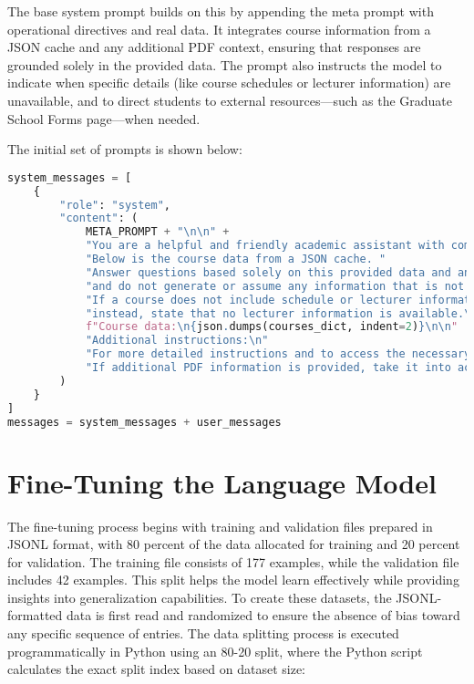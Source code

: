 \documentclass[12pt,oneside,openany]{report}
\begin{document}
The base system prompt builds on this by appending the meta prompt with operational directives and real data. It integrates course information from a JSON cache and any additional PDF context, ensuring that responses are grounded solely in the provided data. The prompt also instructs the model to indicate when specific details (like course schedules or lecturer information) are unavailable, and to direct students to external resources—such as the Graduate School Forms page—when needed.


 The initial set of prompts is shown below:

\begin{lstlisting}[language=Python, breaklines=true]
system_messages = [
    {
        "role": "system",
        "content": (
            META_PROMPT + "\n\n" +
            "You are a helpful and friendly academic assistant with complete and accurate course data. "
            "Below is the course data from a JSON cache. "
            "Answer questions based solely on this provided data and any additional PDF context, "
            "and do not generate or assume any information that is not explicitly provided. "
            "If a course does not include schedule or lecturer information, do not list any lecturers; "
            "instead, state that no lecturer information is available.\n\n"
            f"Course data:\n{json.dumps(courses_dict, indent=2)}\n\n"
            "Additional instructions:\n"
            "For more detailed instructions and to access the necessary forms, visit the [Graduate School Forms](https://uncw.edu/myuncw/academics/graduate-school/forms) page.\n\n"
            "If additional PDF information is provided, take it into account, but do not invent details that are not present."
        )
    }
]
messages = system_messages + user_messages
\end{lstlisting}



\section{Fine-Tuning the Language Model}


The fine-tuning process begins with training and validation files prepared in JSONL format, with 80 percent of the data allocated for training and 20 percent for validation. The training file consists of 177 examples, while the validation file includes 42 examples. This split helps the model learn effectively while providing insights into generalization capabilities. To create these datasets, the JSONL-formatted data is first read and randomized to ensure the absence of bias toward any specific sequence of entries. The data splitting process is executed programmatically in Python using an 80-20 split, where the Python script calculates the exact split index based on dataset size:
\end{document}
